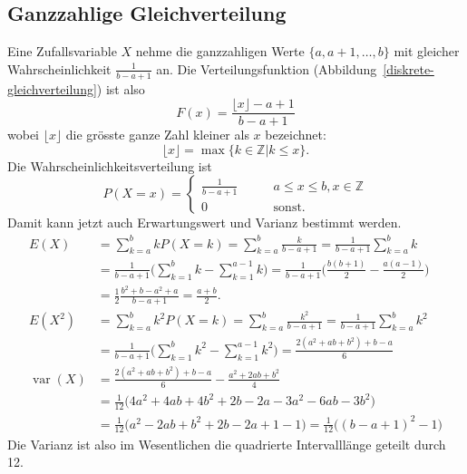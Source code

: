 \subsection{Ganzzahlige Gleichverteilung}
Eine Zufallsvariable $X$ nehme die ganzzahligen Werte $\{a,a+1,\dots,b\}$ mit 
gleicher Wahrscheinlichkeit $\frac1{b-a+1}$ an.
Die Verteilungsfunktion
(Abbildung~\ref{diskrete-gleichverteilung})
ist also
\[
F(x)=
\frac{\lfloor x \rfloor -a+1}{b-a+1}
\]
wobei $\lfloor x \rfloor$ die grösste ganze Zahl kleiner als $x$
bezeichnet:
\[
\lfloor x\rfloor = \max\{k\in\mathbb Z|k\le x\}.
\]
Die Wahrscheinlichkeitsverteilung ist
\[
P(X=x)=\begin{cases}
\displaystyle \frac1{b-a+1}&\qquad a\le x\le b,x\in\mathbb Z\\
0&\qquad\text{sonst}.
\end{cases}
\]
Damit kann jetzt auch Erwartungswert und Varianz bestimmt werden.
{\allowdisplaybreaks
\begin{align*}
E(X)
&=
\sum_{k=a}^b kP(X=k)
=
\sum_{k=a}^b \frac{k}{b-a+1}
=
\frac1{b-a+1}\sum_{k=a}^bk
\\
&=
\frac1{b-a+1}\biggl(
\sum_{k=1}^bk-\sum_{k=1}^{a-1}k
\biggr)
=
\frac1{b-a+1}\biggl(
\frac{b(b+1)}2-\frac{a(a-1)}2
\biggr)
\\
&=
\frac12\frac{b^2+b-a^2+a}{b-a+1}=\frac{a+b}2.
\\
E(X^2)
&=
\sum_{k=a}^b k^2P(X=k)
=
\sum_{k=a}^b \frac{k^2}{b-a+1}
=
\frac1{b-a+1}\sum_{k=a}^bk^2
\\
&=
\frac1{b-a+1}\biggl(
\sum_{k=1}^bk^2-\sum_{k=1}^{a-1}k^2
\biggr)
=
\frac{ 2(a^2+ab+b^2)+b-a}{6}
\\
\operatorname{var}(X)
&=
\frac{ 2(a^2+ab+b^2)+b-a}{6}
-
\frac{a^2+2ab+b^2}{4}
\\
&=
\frac1{12}\bigl(
4a^2+4ab+4b^2+2b-2a-3a^2-6ab-3b^2
\bigr)
\\
&=
\frac1{12}\bigl(
a^2-2ab+b^2+2b-2a+1-1
\bigr)
=
\frac1{12}\bigl((b-a+1)^2 - 1\bigr)
\end{align*}
}
Die Varianz ist also im Wesentlichen die quadrierte Intervalllänge
geteilt durch 12.
